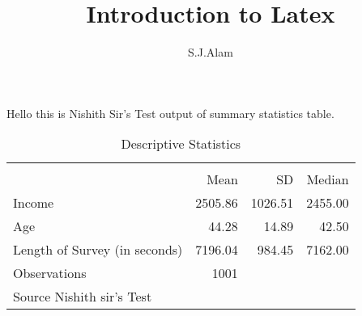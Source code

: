 \documentclass[10pt,a4paper,twoside]{article}
\author{S.J.Alam}
\title{Introduction to Latex}
\begin{document}
\maketitle
Hello this is Nishith Sir's Test output of summary statistics table.


\begin{table}[htbp]\centering
\def\sym#1{\ifmmode^{#1}\else\(^{#1}\)\fi}
\caption{Descriptive Statistics}
\begin{tabular}{l*{1}{rrr}}
\toprule
                    &\multicolumn{3}{c}{}                  \\
                    &        Mean&          SD&      Median\\
\midrule
Income              &     2505.86&     1026.51&     2455.00\\
Age                 &       44.28&       14.89&       42.50\\
Length of Survey (in seconds)&     7196.04&      984.45&     7162.00\\
\midrule
Observations        &        1001&            &            \\
\bottomrule
\multicolumn{4}{l}{\footnotesize Source Nishith sir's Test}\\
\end{tabular}
\end{table}
\end{document}
